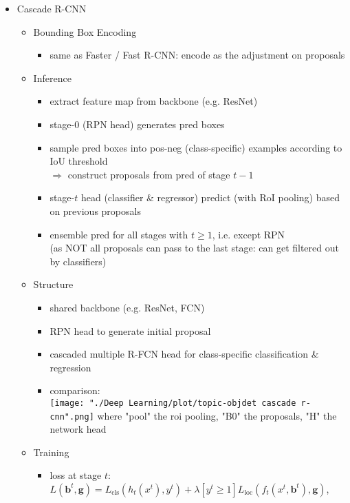 \begin{itemize}
\item Cascade R-CNN
	\begin{itemize}
	\item Bounding Box Encoding
		\begin{itemize}
		\item same as Faster / Fast R-CNN: encode as the adjustment on proposals
		\end{itemize}
	\item Inference
		\begin{itemize}
		\item extract feature map from backbone (e.g. ResNet)
		\item stage-0 (RPN head) generates pred boxes
		\item sample pred boxes into pos-neg (class-specific) examples according to IoU threshold \\
		$\Rightarrow$ construct proposals from pred of stage $t-1$
		\item stage-$t$ head (classifier \& regressor) predict (with RoI pooling) based on previous proposals
		\item ensemble pred for all stages with $t\ge1$, i.e. except RPN \\
		(as NOT all proposals can pass to the last stage: can get filtered out by classifiers)
		\end{itemize}
	\item Structure
		\begin{itemize}
		\item shared backbone (e.g. ResNet, FCN)
		\item RPN head to generate initial proposal
		\item cascaded multiple R-FCN head for class-specific classification \& regression
		\item comparison: \\ 
		\texttt{[image: "./Deep Learning/plot/topic-objdet cascade r-cnn".png]}
		where "pool" the roi pooling, "B0" the proposals, "H" the network head
		\end{itemize}
	\item Training
		\begin{itemize}
		\item loss at stage $t$: \\
		$\displaystyle L(\mathbf b^t, \mathbf g) = L_\text{cls}(h_t(x^t), y^t) + \lambda [y^t\ge 1] L_\text{loc}(f_t(x^t, \mathbf b^t), \mathbf g)$,\\
		\abovedisplayskip=2pt\abovedisplayshortskip=2pt~\vspace*{-\baselineskip}

\end{itemize}
\end{itemize}
\end{itemize}
